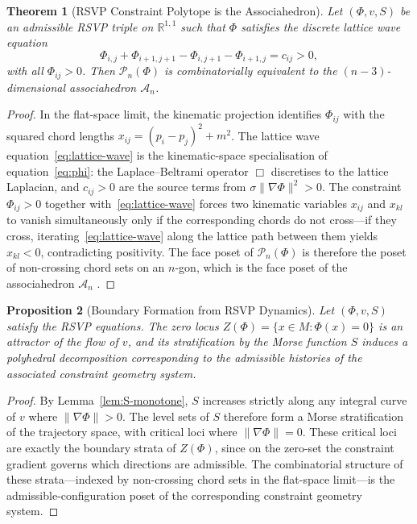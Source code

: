 \documentclass[11pt]{article}
\theoremstyle{plain}
\newtheorem{theorem}{Theorem}[section]
\newtheorem{proposition}[theorem]{Proposition}
\theoremstyle{definition}
\theoremstyle{remark}
\newcommand{\R}{\mathbb{R}}
\newcommand{\Phif}{\Phi}
\newcommand{\vf}{v}
\newcommand{\Sf}{S}
\newcommand{\Assoc}{\mathcal{A}_n}
\begin{document}
\begin{theorem}[RSVP Constraint Polytope is the Associahedron]
\label{thm:assoc}
Let $(\Phif, \vf, \Sf)$ be an admissible RSVP triple on $\R^{1,1}$ such that $\Phif$ satisfies the discrete lattice wave equation
\begin{equation}
\label{eq:lattice-wave}
  \Phif_{i,j} + \Phif_{i+1,j+1} - \Phif_{i,j+1} - \Phif_{i+1,j} = c_{ij} > 0,
\end{equation}
with all $\Phif_{ij} > 0$. Then $\mathcal{P}_n(\Phif)$ is combinatorially equivalent to the $(n-3)$-dimensional associahedron $\Assoc$.
\end{theorem}

\begin{proof}
In the flat-space limit, the kinematic projection identifies $\Phif_{ij}$ with the squared chord lengths $x_{ij} = (p_i - p_j)^2 + m^2$. The lattice wave equation~\eqref{eq:lattice-wave} is the kinematic-space specialisation of equation~\eqref{eq:phi}: the Laplace--Beltrami operator $\Box$ discretises to the lattice Laplacian, and $c_{ij} > 0$ are the source terms from $\sigma\|\nabla\Phif\|^2 > 0$. The constraint $\Phif_{ij} > 0$ together with~\eqref{eq:lattice-wave} forces two kinematic variables $x_{ij}$ and $x_{kl}$ to vanish simultaneously only if the corresponding chords do not cross---if they cross, iterating~\eqref{eq:lattice-wave} along the lattice path between them yields $x_{kl} < 0$, contradicting positivity. The face poset of $\mathcal{P}_n(\Phif)$ is therefore the poset of non-crossing chord sets on an $n$-gon, which is the face poset of the associahedron $\Assoc$ \cite{Stasheff1963, Loday2004}.
\end{proof}

\begin{proposition}[Boundary Formation from RSVP Dynamics]
\label{prop:boundary-formation}
Let $(\Phif, \vf, \Sf)$ satisfy the RSVP equations. The zero locus $Z(\Phif) = \{x \in M : \Phif(x) = 0\}$ is an attractor of the flow of $\vf$, and its stratification by the Morse function $\Sf$ induces a polyhedral decomposition corresponding to the admissible histories of the associated constraint geometry system.
\end{proposition}

\begin{proof}
By Lemma~\ref{lem:S-monotone}, $\Sf$ increases strictly along any integral curve of $\vf$ where $\|\nabla\Phif\| > 0$. The level sets of $\Sf$ therefore form a Morse stratification of the trajectory space, with critical loci where $\|\nabla\Phif\| = 0$. These critical loci are exactly the boundary strata of $Z(\Phif)$, since on the zero-set the constraint gradient governs which directions are admissible. The combinatorial structure of these strata---indexed by non-crossing chord sets in the flat-space limit---is the admissible-configuration poset of the corresponding constraint geometry system.
\end{proof}
\end{document}
